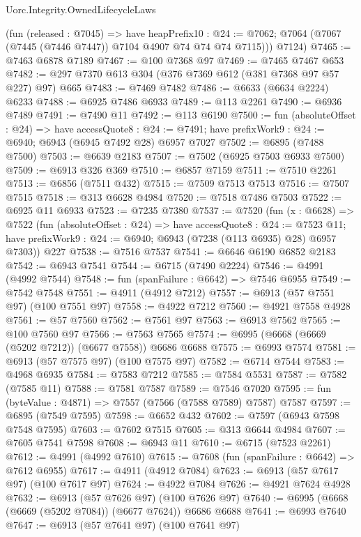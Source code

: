 \begin{lexlean}{Uorc.Integrity.OwnedLifecycleLaws}
\begin{coremodule}
        (fun (released : @7045) =>
        have heapPrefix10 : @24 := @7062;
        @7064 (@7067 (@7445 (@7446 @7447)) @7104 @4907 @74 @74 @74 @7115)))
      @7124)
@7465 := @7463 @6878 @7189
@7467 := @100 @7368 @97
@7469 := @7465 @7467 @653
@7482 := @297 @7370 @613 @304 (@376 @7369 @612 (@381 @7368 @97 @57 @227) @97) @665
@7483 := @7469 @7482
@7486 := @6633 (@6634 @2224) @6233
@7488 := @6925 @7486 @6933
@7489 := @113 @2261
@7490 := @6936 @7489
@7491 := @7490 @11
@7492 := @113 @6190
@7500 := fun (absoluteOffset : @24) =>
  have accessQuote8 : @24 := @7491;
  have prefixWork9 : @24 := @6940; @6943 (@6945 @7492 @28) @6957 @7027
@7502 := @6895 (@7488 @7500)
@7503 := @6639 @2183
@7507 := @7502 (@6925 @7503 @6933 @7500)
@7509 := @6913 @326 @369
@7510 := @6857 @7159
@7511 := @7510 @2261
@7513 := @6856 (@7511 @432)
@7515 := @7509 @7513 @7513
@7516 := @7507 @7515
@7518 := @313 @6628 @4984
@7520 := @7518 @7486 @7503
@7522 := @6925 @11 @6933
@7523 := @7235 @7380
@7537 := @7520
    (fun (x : @6628) =>
    @7522
      (fun (absoluteOffset : @24) =>
      have accessQuote8 : @24 := @7523 @11;
      have prefixWork9 : @24 := @6940; @6943 (@7238 (@113 @6935) @28) @6957 @7303))
    @227
@7538 := @7516 @7537
@7541 := @6646 @6190 @6852 @2183
@7542 := @6943 @7541
@7544 := @6715 (@7490 @2224)
@7546 := @4991 (@4992 @7544)
@7548 := fun (spanFailure : @6642) => @7546 @6955
@7549 := @7542 @7548
@7551 := @4911 (@4912 @7212)
@7557 := @6913 (@57 @7551 @97) (@100 @7551 @97)
@7558 := @4922 @7212
@7560 := @4921 @7558 @4928
@7561 := @57 @7560
@7562 := @7561 @97
@7563 := @6913 @7562
@7565 := @100 @7560 @97
@7566 := @7563 @7565
@7574 := @6995 (@6668 (@6669 (@5202 @7212)) (@6677 @7558)) @6686 @6688
@7575 := @6993 @7574
@7581 := @6913 (@57 @7575 @97) (@100 @7575 @97)
@7582 := @6714 @7544
@7583 := @4968 @6935
@7584 := @7583 @7212
@7585 := @7584 @5531
@7587 := @7582 (@7585 @11)
@7588 := @7581 @7587
@7589 := @7546 @7020
@7595 := fun (byteValue : @4871) => @7557 (@7566 (@7588 @7589) @7587) @7587
@7597 := @6895 (@7549 @7595)
@7598 := @6652 @432
@7602 := @7597 (@6943 @7598 @7548 @7595)
@7603 := @7602 @7515
@7605 := @313 @6644 @4984
@7607 := @7605 @7541 @7598
@7608 := @6943 @11
@7610 := @6715 (@7523 @2261)
@7612 := @4991 (@4992 @7610)
@7615 := @7608 (fun (spanFailure : @6642) => @7612 @6955)
@7617 := @4911 (@4912 @7084)
@7623 := @6913 (@57 @7617 @97) (@100 @7617 @97)
@7624 := @4922 @7084
@7626 := @4921 @7624 @4928
@7632 := @6913 (@57 @7626 @97) (@100 @7626 @97)
@7640 := @6995 (@6668 (@6669 (@5202 @7084)) (@6677 @7624)) @6686 @6688
@7641 := @6993 @7640
@7647 := @6913 (@57 @7641 @97) (@100 @7641 @97)

\end{coremodule}
\end{lexlean}
